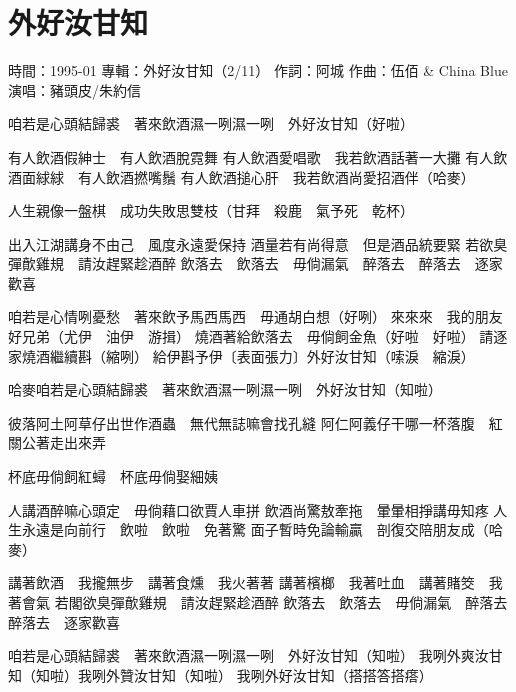\documentclass[UTF8,a4paper,oneside,twocolumn,12pt]{ctexbook}
\newcommand{\infopair}[2]{\textbullet #1：#2}
\newcommand{\zc}[1][伍佰]{\infopair{作詞}{#1}}
\newcommand{\zq}[1][伍佰]{\infopair{作曲}{#1}}
\newcommand{\zj}[1]{\infopair{專輯}{#1}}
\newcommand{\sj}[1]{\infopair{時間}{#1}}
\newenvironment{info}{\begin{flushleft}\kaishu
	}
	{\end{flushleft}\normalsize\yahei\par}
\newenvironment{lyric}{
	}
{}
\begin{document}
\section{外好汝甘知}
\begin{info}
	\sj{1995-01}
	\zj{外好汝甘知（2/11）}
	\zc[阿城]
	\zq[伍佰 \& China Blue]
	\infopair{演唱}{豬頭皮/朱約信}
\end{info}
\begin{lyric}
	咱若是心頭結歸裘　著來飲酒濕一咧濕一咧　外好汝甘知（好啦）

	有人飲酒假紳士　有人飲酒脫霓舞
	有人飲酒愛唱歌　我若飲酒話著一大攤
	有人飲酒面絿絿　有人飲酒撚嘴鬚
	有人飲酒搥心肝　我若飲酒尚愛招酒伴（哈麥）

	人生親像一盤棋　成功失敗思雙枝（甘拜　殺鹿　氣予死　乾杯）

	出入江湖講身不由己　風度永遠愛保持
	酒量若有尚得意　但是酒品統要緊
	若欲臭彈歕雞規　請汝趕緊趁酒醉
	飲落去　飲落去　毋倘漏氣　醉落去　醉落去　逐家歡喜

	咱若是心情咧憂愁　著來飲予馬西馬西　毋通胡白想（好咧）
	來來來　我的朋友好兄弟（尤伊　油伊　游揖）
	燒酒著給飲落去　毋倘飼金魚（好啦　好啦）
	請逐家燒酒繼續斟（縮咧）
	給伊斟予伊〔表面張力〕外好汝甘知（嗦淚　縮淚）

	哈麥咱若是心頭結歸裘　著來飲酒濕一咧濕一咧　外好汝甘知（知啦）

	彼落阿土阿草仔出世作酒蟲　無代無誌嘛會找孔縫
	阿仁阿義仔干哪一杯落腹　紅關公著走出來弄

	杯底毋倘飼紅蟳　杯底毋倘娶細姨

	人講酒醉嘛心頭定　毋倘藉口欲賈人車拼
	飲酒尚驚敖牽拖　暈暈相掙講毋知疼
	人生永遠是向前行　飲啦　飲啦　免著驚
	面子暫時免論輸贏　剖復交陪朋友成（哈麥）

	講著飲酒　我攏無步　講著食燻　我火著著
	講著檳榔　我著吐血　講著賭筊　我著會氣
	若閣欲臭彈歕雞規　請汝趕緊趁酒醉
	飲落去　飲落去　毋倘漏氣　醉落去　醉落去　逐家歡喜

	咱若是心頭結歸裘　著來飲酒濕一咧濕一咧　外好汝甘知（知啦）
	我咧外爽汝甘知（知啦）我咧外贊汝甘知（知啦）
	我咧外好汝甘知（搭搭答搭瘩）
\end{lyric}
\end{document}
